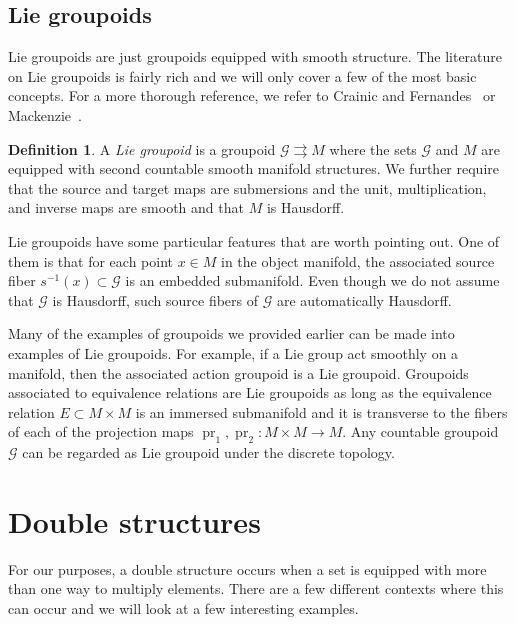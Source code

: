 \documentclass[pdftex]{sigma}
\numberwithin{equation}{section}
\theoremstyle{definition}
\newtheorem{Definition}[Theorem]{Definition}
\newcommand{\CG}{\mathcal{G}}
\newcommand{\inv}{^{-1}}
\newcommand{\grpd}{\rightrightarrows}
\DeclareMathOperator{\pr}{pr}
\begin{document}
\subsection{Lie groupoids}
Lie groupoids are just groupoids equipped with smooth structure. The literature on Lie group\-oids is fairly rich and we will only cover a few of the most basic concepts. For a more thorough reference, we refer to Crainic and Fernandes~\cite{LectOnInt} or Mackenzie~\cite{MackenzieGeneralTheory}.
\begin{Definition}
  A \emph{Lie groupoid} is a groupoid $ \CG \grpd M $ where the sets $ \CG $ and $ M $ are equipped with second countable smooth manifold structures.
  We further require that the source and target maps are submersions and the unit, multiplication, and inverse maps are smooth and that $ M $ is Hausdorff.
\end{Definition}
Lie groupoids have some particular features that are worth pointing out. One of them is that for each point $ x \in M $ in the object manifold, the associated source fiber $ s\inv(x) \subset \CG$ is an embedded submanifold. Even though we do not assume that $ \CG $ is Hausdorff, such source fibers of $ \CG $ are automatically Hausdorff.

Many of the examples of groupoids we provided earlier can be made into examples of Lie groupoids. For example, if a Lie group act smoothly on a manifold, then the associated action groupoid is a Lie groupoid. Groupoids associated to equivalence relations are Lie groupoids as long as the equivalence relation $ E \subset M \times M $ is an immersed submanifold and it is transverse to the fibers of each of the projection maps $ \pr_1, \pr_2 \colon M \times M \to M $. Any countable groupoid $ \CG $ can be regarded as Lie groupoid under the discrete topology.

\section{Double structures}
For our purposes, a double structure occurs when a set is equipped with more than one way to multiply elements. There are a few different contexts where this can occur and we will look at a few interesting examples.
\end{document}

